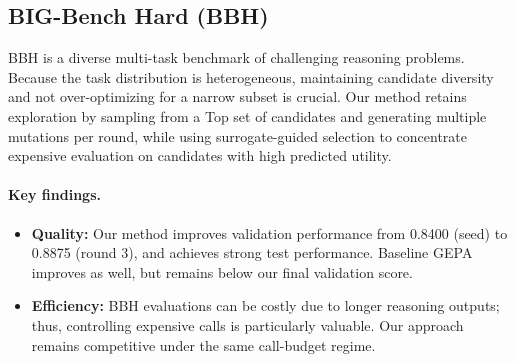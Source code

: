 \begin{table}[H]
\centering
\small
\caption{Comparison between Original GEPA and Ours (\textit{PUPA}).}
\label{tab:pupa}
\end{table}

\subsection{BIG-Bench Hard (BBH)}
BBH is a diverse multi-task benchmark of challenging reasoning problems. Because the task distribution is heterogeneous, maintaining candidate diversity and not over-optimizing for a narrow subset is crucial. Our method retains exploration by sampling from a Top set of candidates and generating multiple mutations per round, while using surrogate-guided selection to concentrate expensive evaluation on candidates with high predicted utility.

\paragraph{Key findings.}
\begin{itemize}
    \item \textbf{Quality:} Our method improves validation performance from 0.8400 (seed) to 0.8875 (round 3), and achieves strong test performance. Baseline GEPA improves as well, but remains below our final validation score.
    \item \textbf{Efficiency:} BBH evaluations can be costly due to longer reasoning outputs; thus, controlling expensive calls is particularly valuable. Our approach remains competitive under the same call-budget regime.
\end{itemize}

